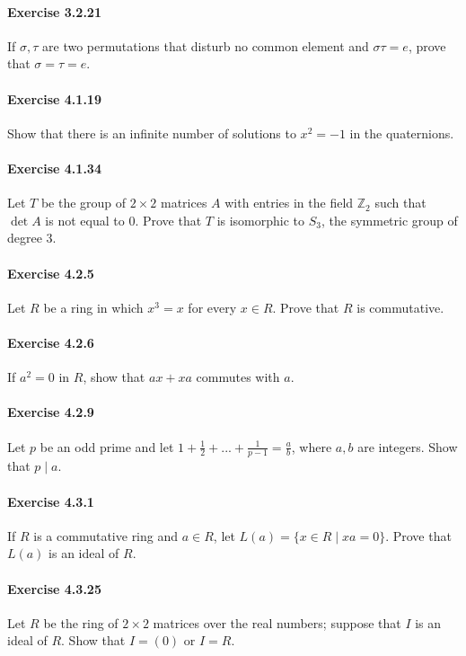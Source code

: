 \documentclass{article}
\begin{document}
\paragraph{Exercise 3.2.21} If $\sigma, \tau$ are two permutations that disturb no common element and $\sigma \tau = e$, prove that $\sigma = \tau = e$.


\paragraph{Exercise 4.1.19} Show that there is an infinite number of solutions to $x^2 = -1$ in the quaternions.


\paragraph{Exercise 4.1.34} Let $T$ be the group of $2\times 2$ matrices $A$ with entries in the field $\mathbb{Z}_2$ such that $\det A$ is not equal to 0. Prove that $T$ is isomorphic to $S_3$, the symmetric group of degree 3.


\paragraph{Exercise 4.2.5} Let $R$ be a ring in which $x^3 = x$ for every $x \in R$. Prove that $R$ is commutative.


\paragraph{Exercise 4.2.6} If $a^2 = 0$ in $R$, show that $ax + xa$ commutes with $a$.


\paragraph{Exercise 4.2.9} Let $p$ be an odd prime and let $1 + \frac{1}{2} + ... + \frac{1}{p - 1} = \frac{a}{b}$, where $a, b$ are integers. Show that $p \mid a$.


\paragraph{Exercise 4.3.1} If $R$ is a commutative ring and $a \in R$, let $L(a) = \{x \in R \mid xa = 0\}$. Prove that $L(a)$ is an ideal of $R$.


\paragraph{Exercise 4.3.25} Let $R$ be the ring of $2 \times 2$ matrices over the real numbers; suppose that $I$ is an ideal of $R$. Show that $I = (0)$ or $I = R$.
\end{document}
